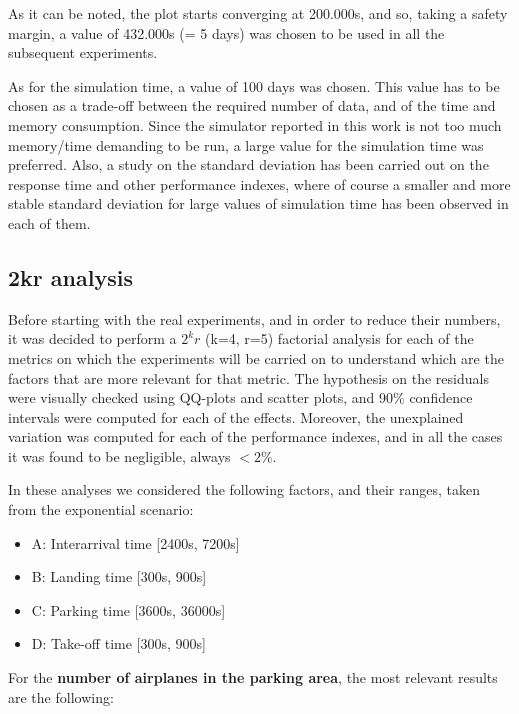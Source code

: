 \documentclass[12pt]{article}
\begin{document}
As it can be noted, the plot starts converging at 200.000s, and so, taking a safety margin, a value of 432.000s (= 5 days) was chosen to be used in all the subsequent experiments.

As for the simulation time, a value of 100 days was chosen. This value has to be chosen as a trade-off between the required number of data, and of the time and memory consumption. 
Since the simulator reported in this work is not too much memory/time demanding to be run, a large value for the simulation time was preferred. Also, a study on the standard deviation has been carried out on the response time and other performance indexes, where of course a smaller and more stable standard deviation for large values of simulation time has been observed in each of them.

\subsection{2kr analysis}

Before starting with the real experiments, and in order to reduce their numbers, it was decided to perform a $ 2^k r $ (k=4, r=5) factorial analysis for each of the metrics on which the experiments will be carried on to understand which are the factors that are more relevant for that metric. 
The hypothesis on the residuals were visually checked using QQ-plots and scatter plots, and 90\% confidence intervals were computed for each of the effects. Moreover, the unexplained variation was computed for each of the performance indexes, and in all the cases it was found to be negligible, always $ < 2\% $.

In these analyses we considered the following factors, and their ranges, taken from the exponential scenario:

\begin{itemize}
    \item A: Interarrival time [2400s, 7200s]
    \item B: Landing time [300s, 900s]
    \item C: Parking time [3600s, 36000s]
    \item D: Take-off time [300s, 900s]
\end{itemize}

For the \textbf{number of airplanes in the parking area}, the most relevant results are the following:
\end{document}
